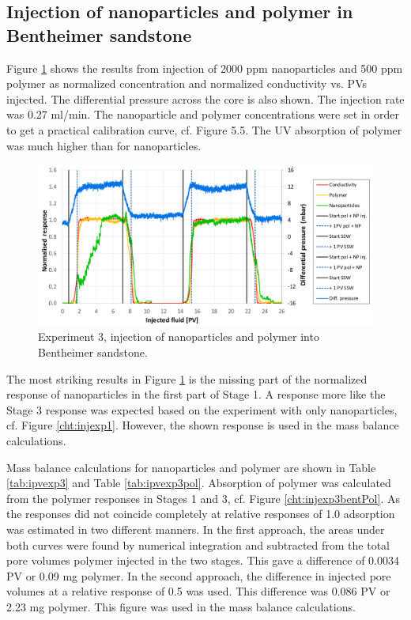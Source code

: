 \subsection{Injection of nanoparticles and polymer in Bentheimer sandstone}

Figure \ref{cht:injexp3bent} shows the results from injection of 2000 ppm nanoparticles and 500 ppm polymer as normalized concentration and normalized conductivity vs. PVs injected. The differential pressure across the core is also shown. The injection rate was 0.27 ml/min. The nanoparticle and polymer concentrations were set in order to get a practical calibration curve, cf. Figure 5.5. The UV absorption of polymer was much higher than for nanoparticles.

\begin{figure}[h]
    \centering
    \includegraphics[width=\textwidth]{img/cht/injexp3bent.png}
    \caption{Experiment 3, injection of nanoparticles and polymer into Bentheimer sandstone.}
    \label{cht:injexp3bent}
\end{figure}

The most striking results in Figure \ref{cht:injexp3bent} is the missing part of the normalized response of nanoparticles in the first part of Stage 1. A response more like the Stage 3 response was expected based on the experiment with only nanoparticles, cf. Figure \ref{cht:injexp1}. However, the shown response is used in the mass balance calculations.

Mass balance calculations for nanoparticles and polymer are shown in Table \ref{tab:ipvexp3} and Table \ref{tab:ipvexp3pol}. Absorption of polymer was calculated from the polymer responses in Stages 1 and 3, cf.  Figure \ref{cht:injexp3bentPol}. As the responses did not coincide completely at relative responses of 1.0 adsorption was estimated in two different manners. In the first approach, the areas under both curves were found by numerical integration and subtracted from the total pore volumes polymer injected in the two stages.  This gave a difference of 0.0034 PV or 0.09 mg polymer. In the second approach, the difference in injected pore volumes at a relative response of 0.5 was used. This difference was 0.086 PV or 2.23 mg polymer. This figure was used in the mass balance calculations.

